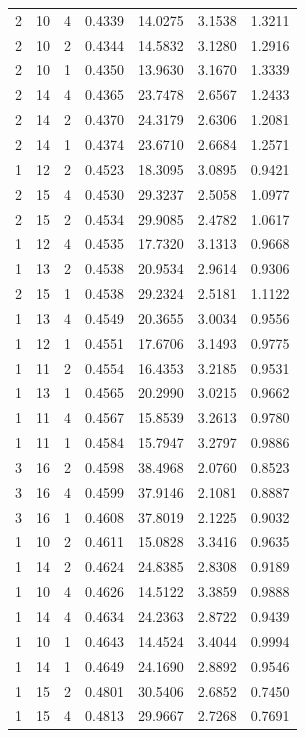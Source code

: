 \begin{tabular}{rrrrrrr}
2 & 10 & 4 & 0.4339 & 14.0275 & 3.1538 & 1.3211 \\
2 & 10 & 2 & 0.4344 & 14.5832 & 3.1280 & 1.2916 \\
2 & 10 & 1 & 0.4350 & 13.9630 & 3.1670 & 1.3339 \\
2 & 14 & 4 & 0.4365 & 23.7478 & 2.6567 & 1.2433 \\
2 & 14 & 2 & 0.4370 & 24.3179 & 2.6306 & 1.2081 \\
2 & 14 & 1 & 0.4374 & 23.6710 & 2.6684 & 1.2571 \\
1 & 12 & 2 & 0.4523 & 18.3095 & 3.0895 & 0.9421 \\
2 & 15 & 4 & 0.4530 & 29.3237 & 2.5058 & 1.0977 \\
2 & 15 & 2 & 0.4534 & 29.9085 & 2.4782 & 1.0617 \\
1 & 12 & 4 & 0.4535 & 17.7320 & 3.1313 & 0.9668 \\
1 & 13 & 2 & 0.4538 & 20.9534 & 2.9614 & 0.9306 \\
2 & 15 & 1 & 0.4538 & 29.2324 & 2.5181 & 1.1122 \\
1 & 13 & 4 & 0.4549 & 20.3655 & 3.0034 & 0.9556 \\
1 & 12 & 1 & 0.4551 & 17.6706 & 3.1493 & 0.9775 \\
1 & 11 & 2 & 0.4554 & 16.4353 & 3.2185 & 0.9531 \\
1 & 13 & 1 & 0.4565 & 20.2990 & 3.0215 & 0.9662 \\
1 & 11 & 4 & 0.4567 & 15.8539 & 3.2613 & 0.9780 \\
1 & 11 & 1 & 0.4584 & 15.7947 & 3.2797 & 0.9886 \\
3 & 16 & 2 & 0.4598 & 38.4968 & 2.0760 & 0.8523 \\
3 & 16 & 4 & 0.4599 & 37.9146 & 2.1081 & 0.8887 \\
3 & 16 & 1 & 0.4608 & 37.8019 & 2.1225 & 0.9032 \\
1 & 10 & 2 & 0.4611 & 15.0828 & 3.3416 & 0.9635 \\
1 & 14 & 2 & 0.4624 & 24.8385 & 2.8308 & 0.9189 \\
1 & 10 & 4 & 0.4626 & 14.5122 & 3.3859 & 0.9888 \\
1 & 14 & 4 & 0.4634 & 24.2363 & 2.8722 & 0.9439 \\
1 & 10 & 1 & 0.4643 & 14.4524 & 3.4044 & 0.9994 \\
1 & 14 & 1 & 0.4649 & 24.1690 & 2.8892 & 0.9546 \\
1 & 15 & 2 & 0.4801 & 30.5406 & 2.6852 & 0.7450 \\
1 & 15 & 4 & 0.4813 & 29.9667 & 2.7268 & 0.7691 \\

\end{tabular}
